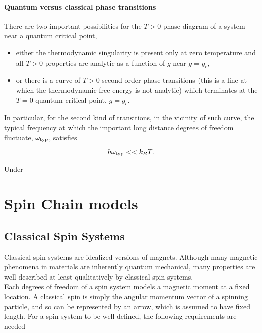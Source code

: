 \documentclass{homework}
\begin{document}
\paragraph{\textbf{Quantum versus classical phase transitions}}

There are two important possibilities for the $T > 0$ phase diagram of a system near a quantum critical point, 

\begin{itemize}
    \item either the thermodynamic singularity is present only at zero temperature and all $T>0$ properties are analytic as a function of $g$ near $g = g_c$,
    \item or there is a curve of $T>0$ second order phase transitions (this is a line at which the thermodynamic free energy is not analytic) which terminates at the $T=0$-quantum critical point, $g = g_c$.
\end{itemize}

In particular, for the second kind of transitions, in the vicinity of such curve, the typical frequency at which the important long distance degrees of freedom fluctuate, $\omega_{\textnormal{typ}}$, satisfies 

$$
\hbar \omega_{\textnormal{typ}} << k_B T.
$$

Under 

\section{Spin Chain models}

\subsection{Classical Spin Systems}

Classical spin systems are idealized versions of magnets. Although many magnetic phenomena in materials are inherently quantum mechanical, many properties are well described at least qualitatively by classical spin systems. \\

Each degrees of freedom of a spin system models a magnetic moment at a fixed location. A classical spin is simply the angular momentum vector of a spinning particle, and so can be represented by an arrow, which is assumed to have fixed length. For a spin system to be well-defined, the following requirements are needed 
\end{document}
